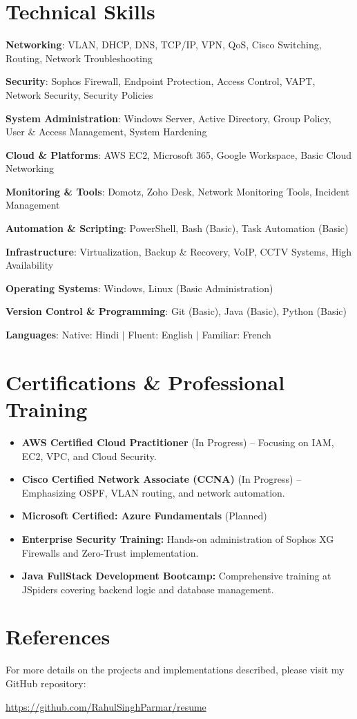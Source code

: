 \documentclass[letterpaper,10pt]{article}
\newcommand{\resumeItem}[1]{
  \item\small{#1 \vspace{-2pt}}
}
\newcommand{\resumeItemListStart}{\begin{itemize}[leftmargin=0.15in]}
\newcommand{\resumeItemListEnd}{\end{itemize}\vspace{-5pt}}
\begin{document}
\section{Technical Skills}
 \begin{itemize}[leftmargin=0.15in]
    \small{\item{
     \textbf{Networking}{: VLAN, DHCP, DNS, TCP/IP, VPN, QoS, Cisco Switching, Routing, Network Troubleshooting} 
    }}
    \small{\item{
     \textbf{Security}{: Sophos Firewall, Endpoint Protection, Access Control, VAPT, Network Security, Security Policies} 
    }}
    \small{\item{
     \textbf{System Administration}{: Windows Server, Active Directory, Group Policy, User \& Access Management, System Hardening} 
    }}
    \small{\item{
     \textbf{Cloud \& Platforms}{: AWS EC2, Microsoft 365, Google Workspace, Basic Cloud Networking} 
    }}
    \small{\item{
     \textbf{Monitoring \& Tools}{: Domotz, Zoho Desk, Network Monitoring Tools, Incident Management} 
    }}
    \small{\item{
     \textbf{Automation \& Scripting}{: PowerShell, Bash (Basic), Task Automation (Basic)} 
    }}
    \small{\item{
     \textbf{Infrastructure}{: Virtualization, Backup \& Recovery, VoIP, CCTV Systems, High Availability} 
    }}
    \small{\item{
     \textbf{Operating Systems}{: Windows, Linux (Basic Administration)} 
    }}
    \small{\item{
     \textbf{Version Control \& Programming}{: Git (Basic), Java (Basic), Python (Basic)} 
    }}
    \small{\item{
     \textbf{Languages}{: Native: Hindi $|$ Fluent: English $|$ Familiar: French} 
    }}
 \end{itemize}

\section{Certifications \& Professional Training}
\resumeItemListStart
    \resumeItem{\textbf{AWS Certified Cloud Practitioner} (In Progress) -- Focusing on IAM, EC2, VPC, and Cloud Security.}
    \resumeItem{\textbf{Cisco Certified Network Associate (CCNA)} (In Progress) -- Emphasizing OSPF, VLAN routing, and network automation.}
    \resumeItem{\textbf{Microsoft Certified: Azure Fundamentals} (Planned)}
    \resumeItem{\textbf{Enterprise Security Training:} Hands-on administration of Sophos XG Firewalls and Zero-Trust implementation.}
    \resumeItem{\textbf{Java FullStack Development Bootcamp:} Comprehensive training at JSpiders covering backend logic and database management.}
\resumeItemListEnd

 \vfill 
 \section*{References}
 For more details on the projects and implementations described, please visit my GitHub repository:
 \begin{center}
 \href{https://github.com/RahulSinghParmar/resume}{https://github.com/RahulSinghParmar/resume} 
 \end{center}
\end{document}
